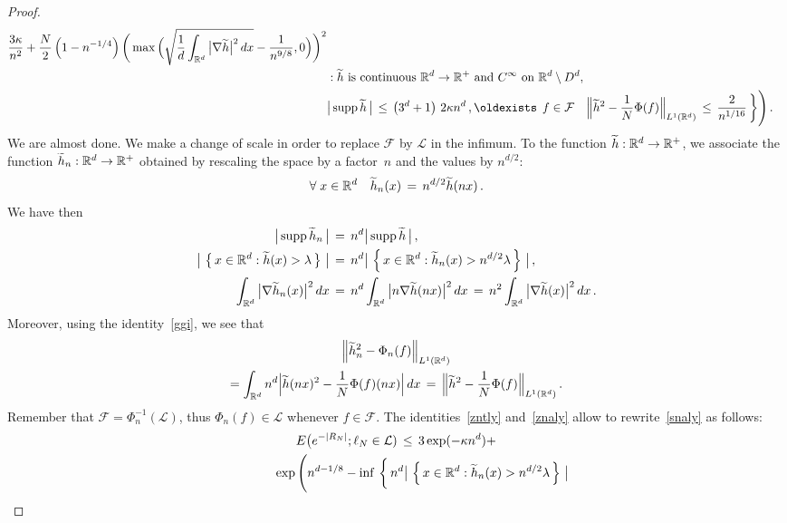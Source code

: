 \documentclass[AHL, Unicode, longabstracts, published]{cedram}
\newcommand*\supp{\text{supp\,}}
\newcommand*\Rd {{\mathbb R^d}}
\newcommand*\R{\mathbb{R}}
\newcommand*\hht{\smash{\widetilde h}}
\newcommand{\cF}{\mathcal{F}}
\newcommand{\cL}{\mathcal{L}}
\renewcommand*{\exists}{\mathrel{\oldexists}}
\let\oldforall\forall
\renewcommand*{\forall}{\mathrel{\oldforall}}
\begin{document}
\begin{proof}
\begin{multline}
\begin{aligned}
\frac{3\kappa}{n^2} +
\frac{N} {2} \left(1-n^{-1/4}\right)
\bigg(\max\Big(
\sqrt{
\frac{1}{d}\int_{\Rd}\big|\nabla \hht\big|^2\,dx }-
\frac{1}{n^{9/8}},0\Big) \bigg)^2
\\
& :\hht \text{ is continuous } \Rd\to\R^+
\text{ and }C^\infty\text{ on }\Rd\setminus D^d,\\
&\big|\,\supp\hht\,\big|\,\leq\, \left(3^d+1\right)\,2\kappa n^d\,,
\exists\,f\in\cF\quad
\Big\|\hht^2- \frac{1}{N} \Phi(f) \Big\|_{L^1(\Rd)}
\,\leq\,
\frac{2}{n^{1/16}}
\,\bigg\}\Bigg)\,.
\end{aligned}
\end{multline}
We are almost done. We make a change of scale in order to replace $\cF$ by $\cL$ in the infimum. To the function $\hht: \Rd\to\R^+$, we associate the function $\hht_n: \Rd\to\R^+$ obtained by rescaling the space by a factor~$n$ and the values by $n^{d/2}$:
\[
\forall x\in\Rd\quad \hht_n(x)\,=\,
{n^{d/2}} {\widetilde{h}(nx)}
\,.
\]
We have then
\begin{equation}\label{zntly}
\begin{aligned}
\big|\,\supp\hht_n\,\big|\,&=\, n^d\big|\,\supp\hht\,\big|\,,\\
\big|\,\left\{\,x\in \Rd:\hht(x)>\lambda\,\right\}\,\big| \,&=\, {n^d}
\big|\,\left\{\,x\in \Rd:\hht_n(x)>n^{d/2}{\lambda}\,\right\}\,\big|
\,,\\
\int_{\Rd}\big|\nabla \hht_n(x)\big|^2\,dx \,&=\, n^d
\int_{\Rd}\big| n
\nabla {\widetilde{h}}(nx)\big|^2\,dx
\,=\, n^{2}
\int_{\Rd}\big|
\nabla {\widetilde{h}}(x)\big|^2\,dx
\,.
\end{aligned}
\end{equation}
Moreover, using the identity~\eqref{ggi}, we see that
\begin{multline}\label{znaly}
\Big\|\hht_n^2- \Phi_n(f) \Big\|_{L^1(\Rd)}\\
=\int_{\Rd} n^d\Big|\hht(nx)^2-
\frac{1}{N} \Phi(f)(nx)
\Big|\,dx\,=\,
\Big\|\hht^2- \frac{1}{N} \Phi(f) \Big\|_{L^1(\Rd)}\,.
\end{multline}
Remember that $\cF=\Phi_n^{-1}(\cL)$, thus $\Phi_n(f)\in\cL$ whenever $f\in\cF$. The identities~\eqref{zntly} and~\eqref{znaly} allow to rewrite~\eqref{snaly} as follows:
\begin{multline}\label{tnaly}
E\big(e^{-|R_N|};
\ell_N\in\cL)\,\leq\, 3\exp(-\kappa n^d)+
\\
\begin{aligned}
&\mkern90mu\exp\Bigg(n^{d-1/8}-
\inf\,\bigg\{\, n^d
\big|\,\left\{\,x\in \Rd:\hht_n(x)>n^{d/2}{\lambda}\,\right\}\,\big|

\end{aligned}
\end{multline}
\end{proof}
\end{document}
